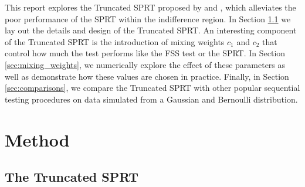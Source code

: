 \documentclass[11pt]{article}
\begin{document}
This report explores the Truncated SPRT proposed by \citet{tantara1977} and \citet{tantara1982}, which alleviates the poor performance of the SPRT within the indifference region. In Section \ref{sec:trunc_sprt} we lay out the details and design of the Truncated SPRT. An interesting component of the Truncated SPRT is the introduction of mixing weights $c_1$ and $c_2$ that control how much the test performs like the FSS test or the SPRT. In Section \ref{sec:mixing_weights}, we numerically explore the effect of these parameters as well as demonstrate how these values are chosen in practice. Finally, in Section \ref{sec:comparisons}, we compare the Truncated SPRT with other popular sequential testing procedures on data simulated from a Gaussian and Bernoulli distribution.

\section{Method}\label{sec:method}

\subsection{The Truncated SPRT}\label{sec:trunc_sprt}
\end{document}
